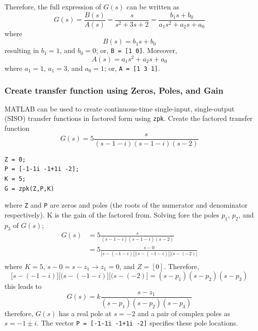 \documentclass[12pt,letter]{article}
\numberwithin{ex}{section} %
\numberwithin{re}{section} %
\numberwithin{equation}{section}	%
\begin{document}
Therefore, the full expression of $G(s)$ can be written as
\begin{equation}
G(s) = \frac{B(s)}{A(s)} = \frac{s}{s^2 + 3s + 2} = \frac{b_1s + b_0}{a_1s^2 + a_2 s + a_0}
\end{equation}
where 
\begin{equation}
B(s) = b_1s + b_0 
\end{equation}
resulting in  $b_1=1$, and $b_0=0$; or, \texttt{B = [1 0]}. Moreover, 
\begin{equation}
A(s) = a_1s^2 + a_2 s + a_0
\end{equation}
where $a_1=1$, $a_1=3$, and $a_0=1$; or, \texttt{A = [1 3 1]}.

\subsubsection{Create transfer function using Zeros, Poles, and Gain}

MATLAB can be used to create continuous-time single-input, single-output (SISO) transfer functions in factored form using \texttt{zpk}. Create the factored transfer function 
\begin{equation}
G(s) =  5 \frac{s}{(s-1-i)(s-1-i)(s-2)}
\end{equation}

\lstset{linewidth=5.8in}
\begin{minipage}{1\textwidth}
  \begin{center}
\begin{lstlisting}
Z = 0;
P = [-1-1i -1+1i -2]; 
K = 5;
G = zpk(Z,P,K)
\end{lstlisting}
  \end{center}
\end{minipage}

\noindent where \texttt{Z} and \texttt{P} are zeros and poles (the roots of the numerator and denominator respectively). K is the gain of the factored from. Solving fore the poles $p_1$, $p_2$, and $p_3$ of $G(s)$;
\begin{align}
G(s) &=  5 \frac{s}{(s-1-i)(s-1-i)(s-2)} \\
&=  5 \frac{s-0}{\big[s-(-1-i)\big]\big[(s-(-1-i)\big]\big[(s-(-2)\big]} \nonumber \\
\end{align}
where $K=5$, $s-0=s-z_1 \rightarrow z_1 = 0$, and $Z=[0]$. Therefore, 
\begin{equation}
\big[s-(-1-i)\big]\big[(s-(-1-i)\big]\big[(s-(-2)\big] = (s-p_1)(s-p_2)(s-p_3)
\end{equation}
this leads to
\begin{equation}
G(s) =  k \frac{s-z_1}{(s-p_1)(s-p_2)(s-p_3)}
\end{equation}
therefore, $G(s)$ has a real pole at $s=-2$ and a pair of complex poles as $s= -1 \pm i$. The vector \texttt{P = [-1-1i -1+1i -2]} specifies these pole locations.
\end{document}
